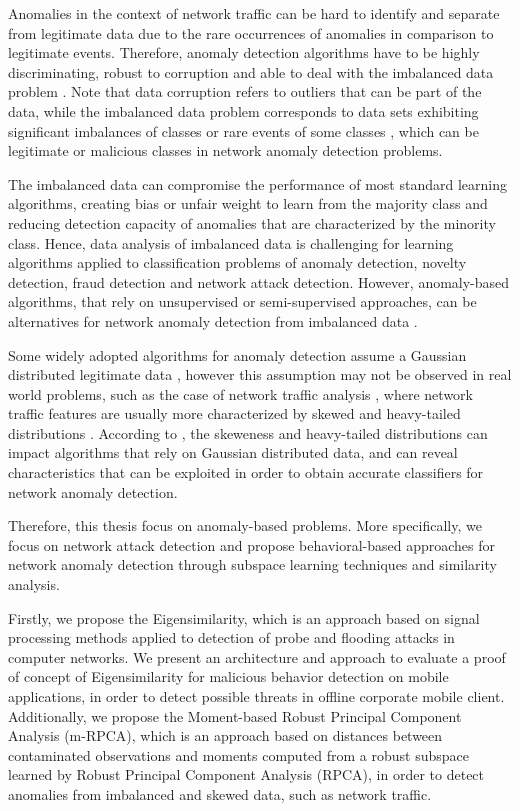 Anomalies in the context of network traffic can be hard to identify and separate from legitimate data due to the rare occurrences of anomalies in comparison to legitimate events. Therefore, anomaly detection algorithms have to be highly discriminating, robust to corruption and able to deal with the imbalanced data problem \cite{he2008learning}. Note that data corruption refers to outliers that can be part of the data, while the imbalanced data problem corresponds to data sets exhibiting significant imbalances of classes or rare events of some classes \cite{he2009learning}, which can be legitimate or malicious classes in network anomaly detection problems. 

The imbalanced data can compromise the performance of most standard learning algorithms, creating bias or unfair weight to learn from the majority class and reducing detection capacity of anomalies that are characterized by the minority class. Hence, data analysis of imbalanced data is challenging for learning algorithms applied to classification problems of anomaly detection, novelty detection, fraud detection and network attack detection. However, anomaly-based algorithms, that rely on unsupervised or semi-supervised approaches, can be alternatives for network anomaly detection from imbalanced data \cite{moustafa2019holistic}.

Some widely adopted algorithms for anomaly detection assume a Gaussian distributed legitimate data \cite{lakhina2005mining}, however this assumption may not be observed in real world problems, such as the case of network traffic analysis \cite{benson2010network}, where network traffic features are usually more characterized by skewed and heavy-tailed distributions \cite{benson2010network, leon2017probability}. According to \cite{hubert2009robustskewed}, the skeweness and heavy-tailed distributions can impact algorithms that rely on Gaussian distributed data, and can reveal characteristics that can be exploited in order to obtain accurate classifiers for network anomaly detection.

Therefore, this thesis focus on anomaly-based problems. More specifically, we focus on network attack detection and propose behavioral-based approaches for network anomaly detection through subspace learning techniques and similarity analysis. 

Firstly, we propose the Eigensimilarity, which is an approach based on signal processing methods applied to detection of probe and flooding attacks in computer networks. We present an architecture and approach to evaluate a proof of concept of Eigensimilarity for malicious behavior detection on mobile applications, in order to detect possible threats in offline corporate mobile client. Additionally, we propose the Moment-based Robust Principal Component Analysis (m-RPCA), which is an approach based on distances between contaminated observations and moments computed from a robust subspace learned by Robust Principal Component Analysis (RPCA), in order to detect anomalies from imbalanced and skewed data, such as network traffic.

